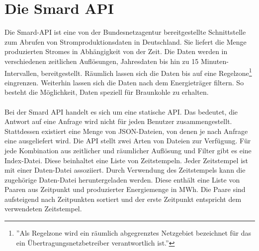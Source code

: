 \section{Die Smard API}

Die Smard-API\cite{noauthor_bundesapismard-api_nodate} ist eine von der Bundesnetzagentur bereitgestellte Schnittstelle zum Abrufen von Stromproduktionsdaten in Deutschland. Sie liefert die Menge produzierten Stromes in Abhängigkeit von der Zeit. Die Daten werden in verschiedenen zeitlichen Auflösungen, Jahresdaten bis hin zu 15 Minuten-Intervallen, bereitgestellt. Räumlich lassen sich die Daten bis auf eine Regelzone\footnote{''Als Regelzone wird ein räumlich abgegrenztes Netzgebiet bezeichnet für das ein Übertragungsnetzbetreiber verantwortlich ist.''\cite{noauthor_smard_nodate}} eingrenzen. Weiterhin lassen sich die Daten nach dem Energieträger filtern. So besteht die Möglichkeit, Daten speziell für Braunkohle zu erhalten.\\
\\
Bei der Smard API handelt es sich um eine statische API. Das bedeutet, die Antwort auf eine Anfrage wird nicht für jeden Benutzer zusammengestellt. Stattdessen existiert eine Menge von JSON-Dateien, von denen je nach Anfrage eine ausgeliefert wird. Die API stellt zwei Arten von Dateien zur Verfügung. Für jede Kombination aus zeitlicher und räumlicher Auflösung und Filter gibt es eine Index-Datei. Diese beinhaltet eine Liste von Zeitstempeln. Jeder Zeitstempel ist mit einer Daten-Datei assoziiert. Durch Verwendung des Zeitstempels kann die zugehörige Daten-Datei heruntergeladen werden. Diese enthält eine Liste von Paaren aus Zeitpunkt und produzierter Energiemenge in MWh. Die Paare sind aufsteigend nach Zeitpunkten sortiert und der erste Zeitpunkt entspricht dem verwendeten Zeitstempel.